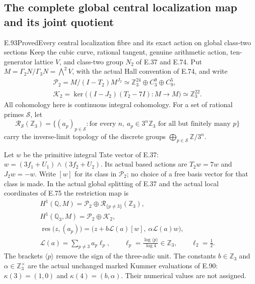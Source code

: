 \subsection{The complete global central localization map and its joint quotient}

\begin{statement}{E.93}{Proved}{Every central localization fibre and its exact action on global class-two sections}
Keep the cubic curve, rational tangent, genuine arithmetic action,
ten-generator lattice $V$, and class-two group $N_2$ of E.37 and
E.74. Put $M=\Gamma_2N/\Gamma_3N=\bigwedge^2V$, with the
actual Hall convention of E.74, and write
\[
 \begin{gathered}
 \mathcal P_2=M/(I-T_2)M^{J_2}
       \simeq\mathbb Z_3^{24}\oplus C_3^9\oplus C_9^5,\\
 \mathcal K_2=\ker\bigl((I-J_2)(T_2-7I):M\longrightarrow M\bigr)
       \simeq\mathbb Z_3^{22}.
 \end{gathered}
 \tag{E93.1}
\]
All cohomology here is continuous integral cohomology. For a set
of rational primes $\mathcal S$, let
\[
 \mathcal R_{\mathcal S}(\mathbb Z_3)
   =\{(a_p)_{p\in\mathcal S}:\text{for every }n,
             \ a_p\in3^n\mathbb Z_3\text{ for all but finitely many }p\}
 \tag{E93.2}
\]
carry the inverse-limit topology of the discrete groups
$\bigoplus_{p\in\mathcal S}\mathbb Z/3^n$.

Let $w$ be the primitive integral Tate vector of E.37:
$w=(3f_1+U_1)\wedge(3f_2+U_2)$. Its actual based actions
are $T_2w=7w$ and $J_2w=-w$. Write $[w]$ for its class in
$\mathcal P_2$; no choice of a free basis vector for that
class is made. In the actual global splitting of E.37 and
the actual local coordinates of E.75 the restriction map is
\[
 \begin{gathered}
 H^1(\mathbb Q,M)
       =\mathcal P_2\oplus\mathcal R_{\{p\ne3\}}(\mathbb Z_3),\\
 H^1(\mathbb Q_3,M)=\mathcal P_2\oplus\mathcal K_2,\\
 \operatorname{res}\bigl(z,(a_p)\bigr)
       =\bigl(z+b\mathcal L(a)[w],\ \alpha\mathcal L(a)w\bigr),\\
 \mathcal L(a)=\sum_{p\ne3}a_p\ell_p,
 \qquad \ell_p=\frac{\log\langle p\rangle}{\log4}\in\mathbb Z_3,
 \qquad \ell_2=\tfrac12.
 \end{gathered}
 \tag{E93.3}
\]
The brackets $\langle p\rangle$ remove the sign of the
three-adic unit. The constants $b\in\mathbb Z_3$ and
$\alpha\in\mathbb Z_3^\times$ are the actual unchanged
marked Kummer evaluations of E.90:
$\kappa(3)=(1,0)$ and $\kappa(4)=(b,\alpha)$.
Their numerical values are not assigned.


\end{statement}
